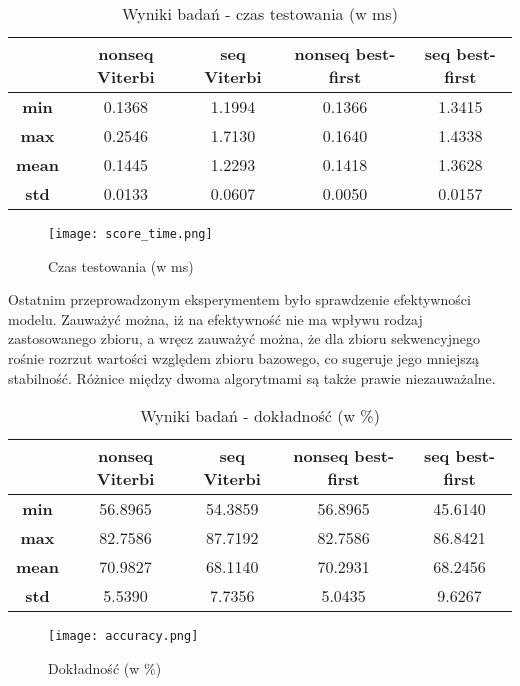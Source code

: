 \begin{table}[ht!]
\centering
\caption{Wyniki badań - czas testowania (w ms)}
\label{my-label}
\begin{tabular}{|c|c|c|c|c|}
\hline
\textbf{}     & \textbf{nonseq Viterbi} & \textbf{seq Viterbi} & \textbf{nonseq best-first} & \textbf{seq best-first} \\ \hline
\textbf{min}  & 0.1368                  & 1.1994               & 0.1366                     & 1.3415                  \\ \hline
\textbf{max}  & 0.2546                  & 1.7130               & 0.1640                     & 1.4338                  \\ \hline
\textbf{mean} & 0.1445                  & 1.2293               & 0.1418                     & 1.3628                  \\ \hline
\textbf{std}  & 0.0133                  & 0.0607               & 0.0050                     & 0.0157                  \\ \hline
\end{tabular}
\end{table}

\begin{figure}[h!]
	\centering
	\texttt{[image: score\_time.png]}
	\label{score-time}
	\caption{Czas testowania (w ms)}
\end{figure}

\newpage

Ostatnim przeprowadzonym eksperymentem było sprawdzenie efektywności modelu. Zauważyć można, iż na efektywność nie ma wpływu rodzaj zastosowanego zbioru, a wręcz zauważyć można, że dla zbioru sekwencyjnego rośnie rozrzut wartości względem zbioru bazowego, co sugeruje jego mniejszą stabilność. Różnice między dwoma algorytmami są także prawie niezauważalne.

\begin{table}[ht!]
\centering
\caption{Wyniki badań - dokładność (w \%)}
\label{my-label}
\begin{tabular}{|c|c|c|c|c|}
\hline
\textbf{}     & \textbf{nonseq Viterbi} & \textbf{seq Viterbi} & \textbf{nonseq best-first} & \textbf{seq best-first} \\ \hline
\textbf{min}  & 56.8965                 & 54.3859              & 56.8965                    & 45.6140                 \\ \hline
\textbf{max}  & 82.7586                 & 87.7192              & 82.7586                    & 86.8421                 \\ \hline
\textbf{mean} & 70.9827                 & 68.1140              & 70.2931                    & 68.2456                 \\ \hline
\textbf{std}  & 5.5390                  & 7.7356               & 5.0435                     & 9.6267                  \\ \hline
\end{tabular}
\end{table}

\begin{figure}[h!]
	\centering
	\texttt{[image: accuracy.png]}
	\label{accuracy}
	\caption{Dokładność (w \%)}
\end{figure}
